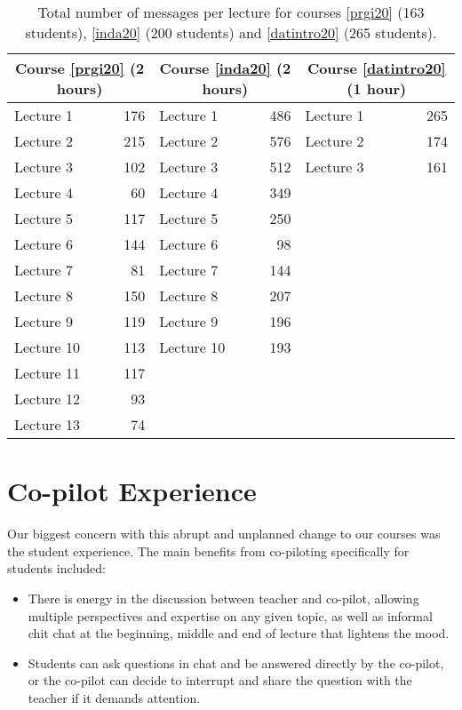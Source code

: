 \documentclass[sigconf,natbib=false]{acmart}
\begin{document}
\begin{table}
    \centering
    \begin{tabular}{lr lr lr}
        \toprule
        \multicolumn{2}{c}{Course \ref{prgi20} (2 hours)} &
        \multicolumn{2}{c}{Course \ref{inda20} (2 hours)} &
        \multicolumn{2}{c}{Course \ref{datintro20} (1 hour)} \\
        \midrule
        Lecture 1 & 176 & Lecture 1 & 486 & Lecture 1 & 265 \\
        Lecture 2 & 215 & Lecture 2 & 576 & Lecture 2 & 174 \\
        Lecture 3 & 102 & Lecture 3 & 512 & Lecture 3 & 161 \\
        Lecture 4 & 60 & Lecture 4 & 349 \\
        Lecture 5 & 117 & Lecture 5 & 250 \\
        Lecture 6 & 144 & Lecture 6 & 98 \\
        Lecture 7 & 81 & Lecture 7 & 144 \\
        Lecture 8 & 150 & Lecture 8 & 207 \\
        Lecture 9 & 119 & Lecture 9 & 196 \\
        Lecture 10 & 113 & Lecture 10 & 193 \\
        Lecture 11 & 117 \\
        Lecture 12 & 93 \\
        Lecture 13 & 74 \\
        \bottomrule
    \end{tabular}
    \caption{Total number of messages per lecture for courses \ref{prgi20} (163 students), \ref{inda20} (200 students) and \ref{datintro20} (265 students).}
    \label{MessageDist}
\end{table}

\section{Co-pilot Experience}

Our biggest concern with this abrupt and unplanned change to our courses was the student experience. The main benefits from co-piloting specifically for students included:

\begin{itemize}
  \item There is energy in the discussion between teacher and co-pilot, 
    allowing multiple perspectives and expertise on any given topic, as well as 
    informal chit chat at the beginning, middle and end of lecture that 
    lightens the mood.

  \item Students can ask questions in chat and be answered directly by the co-pilot, or the co-pilot can decide to interrupt and share the question with the teacher if it demands attention.
\end{itemize}
\end{document}
